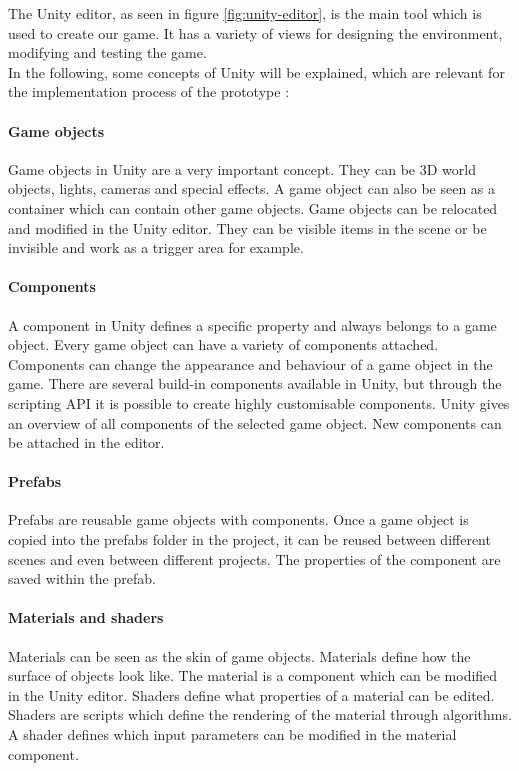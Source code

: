 The Unity editor, as seen in figure \ref{fig:unity-editor}, is the main tool which is used to create our game. It has a variety of views for designing the environment, modifying and testing the game. \\
In the following, some concepts of Unity will be explained, which are  relevant for the implementation process of the prototype \cite{unity.2019}:
\paragraph{Game objects} Game objects in Unity are a very important concept. They can be 3D world objects, lights, cameras and special effects. A game object can also be seen as a container which can contain other game objects. Game objects can be relocated and modified in the Unity editor. They can be visible items in the scene or be invisible and work as a trigger area for example.
\paragraph{Components} A component in Unity defines a specific property and always belongs to a game object. Every game object can have a variety of components attached. Components can change the appearance and behaviour of a game object in the game. There are several build-in components available in Unity, but through the scripting API it is possible to create highly customisable components. Unity gives an overview of all components of the selected game object. New components can be attached in the editor.
\paragraph{Prefabs} Prefabs are reusable game objects with components. Once a game object is copied into the prefabs folder in the project, it can be reused between different scenes and even between different projects. The properties of the component are saved within the prefab.
\paragraph{Materials and shaders} Materials can be seen as the skin of game objects. Materials define how the surface of objects look like. The material is a component which can be modified in the Unity editor. Shaders define what properties of a material can be edited. Shaders are scripts which define the rendering of the material through algorithms. A shader defines which input parameters can be modified in the material component.

